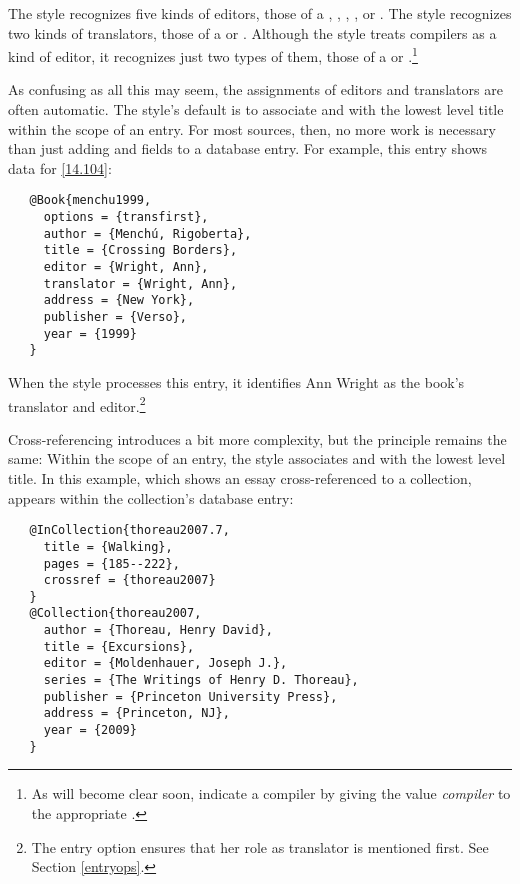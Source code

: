 \documentclass[11pt,letterpaper,oneside]{article}
\begin{document}
The style recognizes five kinds of editors, those of a
, , ,
, or . The style recognizes two
kinds of translators, those of a  or
. Although the style treats compilers as a kind of
editor, it recognizes just two types of them, those of a
 or .\footnote{As will become
clear soon, indicate a compiler by giving the value \textit{compiler}
to the appropriate .}

As confusing as all this may seem, the assignments of editors and
translators are often automatic. The style's default is to associate
 and  with the lowest level
title within the scope of an entry. For most sources, then, no more
work is necessary than just adding  and
 fields to a database entry. For example, this
entry shows data for \ref{14.104}:

\begin{verbatim}
   @Book{menchu1999,
     options = {transfirst},
     author = {Menchú, Rigoberta},
     title = {Crossing Borders},
     editor = {Wright, Ann},
     translator = {Wright, Ann},
     address = {New York},
     publisher = {Verso},
     year = {1999}
   }
\end{verbatim}

\noindent When the style processes this entry, it identifies Ann
Wright as the book's translator and editor.\footnote{The entry option
 ensures that her role as translator is mentioned
first. See Section \ref{entryops}.}

Cross-referencing introduces a bit more complexity, but the principle
remains the same: Within the scope of an entry, the style associates
 and  with the lowest level
title. In this example, which shows an essay cross-referenced to a
collection,  appears within the collection's database
entry:

\begin{verbatim}
   @InCollection{thoreau2007.7,
     title = {Walking},
     pages = {185--222},
     crossref = {thoreau2007}
   }
   @Collection{thoreau2007,
     author = {Thoreau, Henry David},
     title = {Excursions},
     editor = {Moldenhauer, Joseph J.},
     series = {The Writings of Henry D. Thoreau},
     publisher = {Princeton University Press},
     address = {Princeton, NJ},
     year = {2009}
   }
\end{verbatim}
\end{document}
